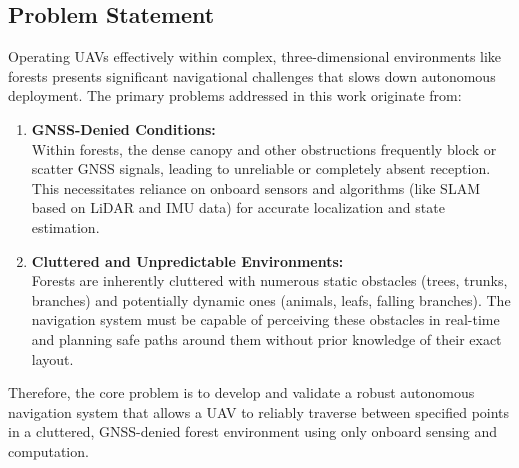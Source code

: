         \subsection{Problem Statement}
            Operating \ac{UAV}s effectively within complex, three-dimensional environments like forests presents significant navigational challenges that slows down autonomous deployment. 
            The primary problems addressed in this work originate from:
            \begin{enumerate}
                \item \textbf{\ac{GNSS}-Denied Conditions: } \\
                Within forests, the dense canopy and other obstructions frequently block or scatter \ac{GNSS} signals, leading to unreliable or completely absent reception.
                This necessitates reliance on onboard sensors and algorithms (like \ac{SLAM} based on \ac{LiDAR} and \ac{IMU} data) for accurate localization and state estimation.
                \item \textbf{Cluttered and Unpredictable Environments: } \\
                Forests are inherently cluttered with numerous static obstacles (trees, trunks, branches) and potentially dynamic ones (animals, leafs, falling branches). 
                The navigation system must be capable of perceiving these obstacles in real-time and planning safe paths around them without prior knowledge of their exact layout.
            \end{enumerate}
            Therefore, the core problem is to develop and validate a robust autonomous navigation system that allows a \ac{UAV} to reliably traverse between specified points in a cluttered, GNSS-denied forest environment using only onboard sensing and computation.

